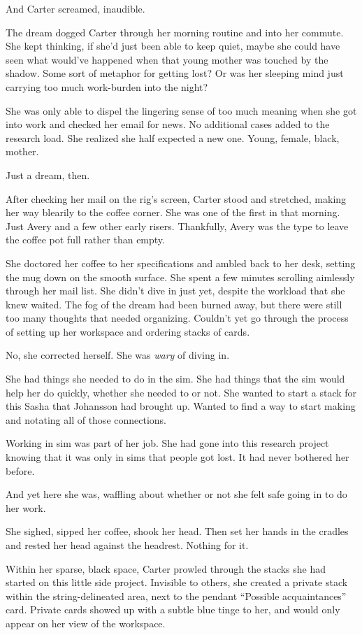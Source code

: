 And Carter screamed, inaudible.

The dream dogged Carter through her morning routine and into her commute. She kept thinking, if she'd just been able to keep quiet, maybe she could have seen what would've happened when that young mother was touched by the shadow. Some sort of metaphor for getting lost? Or was her sleeping mind just carrying too much work-burden into the night?

She was only able to dispel the lingering sense of too much meaning when she got into work and checked her email for news. No additional cases added to the research load. She realized she half expected a new one. Young, female, black, mother.

Just a dream, then.

After checking her mail on the rig's screen, Carter stood and stretched, making her way blearily to the coffee corner. She was one of the first in that morning. Just Avery and a few other early risers. Thankfully, Avery was the type to leave the coffee pot full rather than empty.

She doctored her coffee to her specifications and ambled back to her desk, setting the mug down on the smooth surface. She spent a few minutes scrolling aimlessly through her mail list. She didn't dive in just yet, despite the workload that she knew waited. The fog of the dream had been burned away, but there were still too many thoughts that needed organizing. Couldn't yet go through the process of setting up her workspace and ordering stacks of cards.

No, she corrected herself. She was \emph{wary} of diving in.

She had things she needed to do in the sim. She had things that the sim would help her do quickly, whether she needed to or not. She wanted to start a stack for this Sasha that Johansson had brought up. Wanted to find a way to start making and notating all of those connections.

Working in sim was part of her job. She had gone into this research project knowing that it was only in sims that people got lost. It had never bothered her before.

And yet here she was, waffling about whether or not she felt safe going in to do her work.

She sighed, sipped her coffee, shook her head. Then set her hands in the cradles and rested her head against the headrest. Nothing for it.

Within her sparse, black space, Carter prowled through the stacks she had started on this little side project. Invisible to others, she created a private stack within the string-delineated area, next to the pendant ``Possible acquaintances'' card. Private cards showed up with a subtle blue tinge to her, and would only appear on her view of the workspace.


